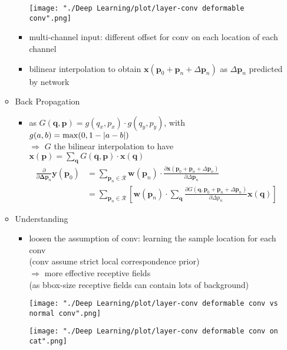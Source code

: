 \begin{itemize}
\begin{itemize}
\begin{itemize}
		\texttt{[image: "./Deep Learning/plot/layer-conv deformable conv".png]} \\
		\item multi-channel input: different offset for conv on each location of each channel
		\item bilinear interpolation to obtain $\mathbf x(\mathbf p_0+\mathbf p_n+\Delta \mathbf p_n)$ as $\Delta \mathbf p_n$ predicted by network
		\end{itemize}
	\item Back Propagation
		\begin{itemize}
		\item as $G(\mathbf q, \mathbf p)=g(q_x, p_x)\cdot g(q_y,p_y)$, with $g(a,b)=\max(0,1-\lvert a-b\rvert)$ \\
		$\Rightarrow$ $G$ the bilinear interpolation to have $\mathbf x(\mathbf p)=\sum_{\mathbf q} G(\mathbf q, \mathbf p)\cdot \mathbf x(\mathbf q)$
		\Item \begin{align*} \frac{\partial}{\partial \mathbf \Delta \mathbf p_n}\mathbf y(\mathbf p_0) &= \sum_{\mathbf p_n\in\mathcal R} \mathbf w(\mathbf p_n)\cdot \frac{\partial \mathbf x(\mathbf p_0+\mathbf p_n+\Delta\mathbf p_n)}{\partial \Delta \mathbf p_n} \\
		&= \sum_{\mathbf p_n\in\mathcal R} \left[ \mathbf w(\mathbf p_n)\cdot \sum_{\mathbf q}\frac{\partial G(\mathbf q, \mathbf p_0+\mathbf p_n+\Delta\mathbf p_n)}{\partial\Delta p_n} \mathbf x (\mathbf q)\right] \end{align*}
		\end{itemize}
	\item Understanding
		\begin{itemize}
		\item loosen the assumption of conv: learning the sample location for each conv \\
		(conv assume strict local correspondence prior) \\
		$\Rightarrow$ more effective receptive fields \\ 
		(as bbox-size receptive fields can contain lots of background) \\
		\begin{minipage}[l]{.5\linewidth}
		\texttt{[image: "./Deep Learning/plot/layer-conv deformable conv vs normal conv".png]}		
		\end{minipage}
		\begin{minipage}[r]{.4\linewidth}
		\texttt{[image: "./Deep Learning/plot/layer-conv deformable conv on cat".png]} \\		

\end{minipage}
\end{itemize}
\end{itemize}
\end{itemize}
